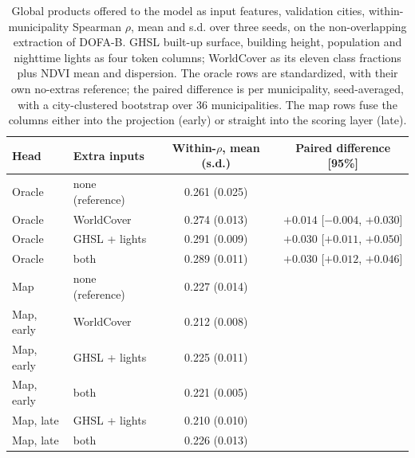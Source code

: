 \begin{table}[htbp]
\centering
\caption{Global products offered to the model as input features, validation cities, within-municipality Spearman $\rho$, mean and s.d. over three seeds, on the non-overlapping extraction of DOFA-B. GHSL built-up surface, building height, population and nighttime lights as four token columns; WorldCover as its eleven class fractions plus NDVI mean and dispersion. The oracle rows are standardized, with their own no-extras reference; the paired difference is per municipality, seed-averaged, with a city-clustered bootstrap over 36 municipalities. The map rows fuse the columns either into the projection (early) or straight into the scoring layer (late).}
\small
\begin{tabular}{llcc}
\toprule
Head & Extra inputs & Within-$\rho$, mean (s.d.) & Paired difference [95\%]\\
\midrule
Oracle & none (reference) & 0.261 (0.025) & \\
Oracle & WorldCover & 0.274 (0.013) & $+0.014$ [$-0.004$, $+0.030$]\\
Oracle & GHSL + lights & 0.291 (0.009) & $+0.030$ [$+0.011$, $+0.050$]\\
Oracle & both & 0.289 (0.011) & $+0.030$ [$+0.012$, $+0.046$]\\
\midrule
Map & none (reference) & 0.227 (0.014) & \\
Map, early & WorldCover & 0.212 (0.008) & \\
Map, early & GHSL + lights & 0.225 (0.011) & \\
Map, early & both & 0.221 (0.005) & \\
Map, late & GHSL + lights & 0.210 (0.010) & \\
Map, late & both & 0.226 (0.013) & \\
\bottomrule
\end{tabular}
\label{tab:inputs}
\end{table}
